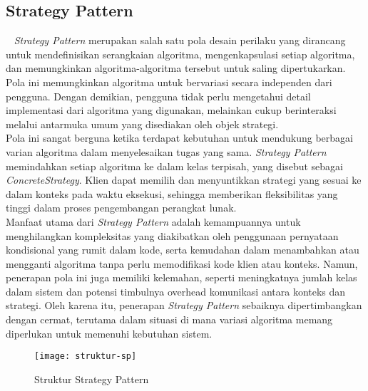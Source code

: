 \subsection{Strategy Pattern}
\label{sec:strategypattern}
~\cite{Gamma:94:design}
\textit{Strategy Pattern} merupakan salah satu pola desain perilaku yang dirancang untuk mendefinisikan serangkaian algoritma, mengenkapsulasi setiap algoritma, dan memungkinkan algoritma-algoritma tersebut untuk saling dipertukarkan. Pola ini memungkinkan algoritma untuk bervariasi secara independen dari pengguna. Dengan demikian, pengguna tidak perlu mengetahui detail implementasi dari algoritma yang digunakan, melainkan cukup berinteraksi melalui antarmuka umum yang disediakan oleh objek strategi.
\\
Pola ini sangat berguna ketika terdapat kebutuhan untuk mendukung berbagai varian algoritma dalam menyelesaikan tugas yang sama. \textit{Strategy Pattern} memindahkan setiap algoritma ke dalam kelas terpisah, yang disebut sebagai \textit{ConcreteStrategy}. Klien dapat memilih dan menyuntikkan strategi yang sesuai ke dalam konteks pada waktu eksekusi, sehingga memberikan fleksibilitas yang tinggi dalam proses pengembangan perangkat lunak.
\\
Manfaat utama dari \textit{Strategy Pattern} adalah kemampuannya untuk menghilangkan kompleksitas yang diakibatkan oleh penggunaan pernyataan kondisional yang rumit dalam kode, serta kemudahan dalam menambahkan atau mengganti algoritma tanpa perlu memodifikasi kode klien atau konteks. Namun, penerapan pola ini juga memiliki kelemahan, seperti meningkatnya jumlah kelas dalam sistem dan potensi timbulnya overhead komunikasi antara konteks dan strategi. Oleh karena itu, penerapan \textit{Strategy Pattern} sebaiknya dipertimbangkan dengan cermat, terutama dalam situasi di mana variasi algoritma memang diperlukan untuk memenuhi kebutuhan sistem.

\begin{figure}[h] 
	\centering  
	\texttt{[image: struktur-sp]}  
	\caption{Struktur Strategy Pattern}
	\label{fig:struktursp} 
\end{figure}

